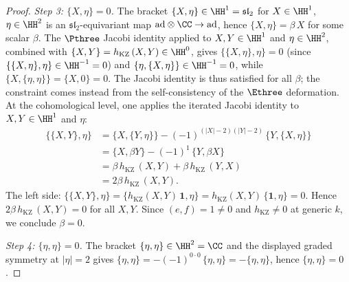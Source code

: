 \begin{proof}
\textit{Step 3: $\{X, \eta\} = 0$.}
The bracket $\{X, \eta\} \in \HH^1 = \mathfrak{sl}_2$
for $X \in \HH^1$, $\eta \in \HH^2$ is an
$\mathfrak{sl}_2$-equivariant map
$\mathrm{ad} \otimes \CC \to \mathrm{ad}$,
hence $\{X, \eta\} = \beta\,X$ for some scalar $\beta$.
The $\Pthree$ Jacobi identity applied to
$X, Y \in \HH^1$ and $\eta \in \HH^2$,
combined with
$\{X, Y\} = h_{\mathrm{KZ}}\,(X, Y) \in \HH^0$, gives
$\{\{X, \eta\}, \eta\} = 0$ (since
$\{\{X, \eta\}, \eta\} \in \HH^{-1} = 0$) and
$\{\eta, \{X, \eta\}\} \in \HH^{-1} = 0$,
while $\{X, \{\eta, \eta\}\} = \{X, 0\} = 0$.
The Jacobi identity is thus satisfied for all $\beta$;
the constraint comes instead from the self-consistency
of the $\Ethree$ deformation.
At the cohomological level, one applies the iterated Jacobi
identity to $X, Y \in \HH^1$ and $\eta$:
\begin{align*}
 \{\{X, Y\}, \eta\}
 &= \{X, \{Y, \eta\}\}
 - (-1)^{(|X|-2)(|Y|-2)}\,\{Y, \{X, \eta\}\} \\
 &= \{X, \beta Y\} - (-1)^1\,\{Y, \beta X\} \\
 &= \beta\,h_{\mathrm{KZ}}\,(X, Y)
 + \beta\,h_{\mathrm{KZ}}\,(Y, X) \\
 &= 2\beta\,h_{\mathrm{KZ}}\,(X, Y).
\end{align*}
The left side:
$\{\{X, Y\}, \eta\}
= \{h_{\mathrm{KZ}}(X, Y)\,\mathbf{1}, \eta\}
= h_{\mathrm{KZ}}(X, Y)\,\{\mathbf{1}, \eta\} = 0$.
Hence $2\beta\,h_{\mathrm{KZ}}\,(X, Y) = 0$ for all
$X, Y$. Since
$(e, f) = 1 \neq 0$ and $h_{\mathrm{KZ}} \neq 0$ at
generic $k$, we conclude $\beta = 0$.

\textit{Step 4: $\{\eta, \eta\} = 0$.}
The bracket $\{\eta, \eta\} \in \HH^2 = \CC$ and
the displayed graded symmetry at
$|\eta| = 2$ gives
$\{\eta, \eta\} = -(-1)^{0 \cdot 0}\,\{\eta, \eta\}
= -\{\eta, \eta\}$, hence $\{\eta, \eta\} = 0$.
\end{proof}

